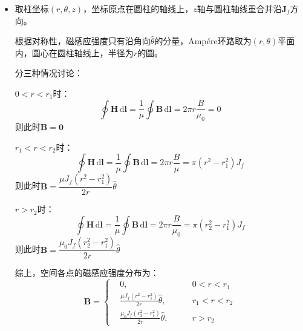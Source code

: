 \documentclass[a4paper,fontset=none]{ctexart}
\begin{document}
\begin{itemize}
        \textparagraph 极化面电荷只分布在界面$r = r_1$及$r = r_2$，设其面密度为$\sigma_p$。

        在界面处有以下方程组：（这里法向量$\bm{n} = \bm{r}$）
        \[
            \bm{n}\cdot(\bm{E}_2 - \bm{E}_1) = E_2 - E_1 = \frac{\sigma_f + \sigma_p}{\varepsilon_0}
        \]
        \[
            \bm{n}\cdot(\bm{D}_2 - \bm{D}_1) = D_2 - D_1 = \sigma_f
        \]
        联立解得：
        \[
            \sigma_p = \left\{
        \begin{aligned}
            & 0,\qquad& r = r_1 \\
            & \frac{\rho_f(r_2^3 - r_1^3)}{3r_2^2}\left(1 - \frac{\varepsilon_0}{\varepsilon}\right),\qquad& r = r_2
        \end{aligned}
        \right.
        \]

        \item[8.(1)]
        取柱坐标$(r,\theta,z)$，坐标原点在圆柱的轴线上，$z$轴与圆柱轴线重合并沿$\bm{J}_f$方向。

        根据对称性，磁感应强度只有沿角向$\hat{\theta}$的分量，Amp\'{e}re环路取为$(r,\theta)$平面内，圆心在圆柱轴线上，半径为$r$的圆。

        分三种情况讨论：

        $0 < r < r_1$时：
        \[
            \oint \bm{H}\,\mathrm{d}\bm{l} = \frac{1}{\mu}\oint \bm{B}\,\mathrm{d}\bm{l} = 2\pi r\frac{B}{\mu_0} = 0
        \]
        则此时$\bm{B} = \bm{0}$

        $r_1 < r < r_2$时：
        \[
            \oint \bm{H}\,\mathrm{d}\bm{l} = \frac{1}{\mu}\oint \bm{B}\,\mathrm{d}\bm{l} = 2\pi r\frac{B}{\mu} = \pi(r^2 - r_1^2)J_f
        \]
        则此时$\bm{B} = \dfrac{\mu J_f(r^2 - r_1^2)}{2r}\hat{\theta}$

        $r > r_2$时：
        \[
            \oint \bm{H}\,\mathrm{d}\bm{l} = \frac{1}{\mu}\oint \bm{B}\,\mathrm{d}\bm{l} = 2\pi r\frac{B}{\mu_0} = \pi(r_2^2 - r_1^2)J_f
        \]
        则此时$\bm{B} = \dfrac{\mu_0 J_f(r_2^2 - r_1^2)}{2r}\hat{\theta}$

        综上，空间各点的磁感应强度分布为：
        \[
            \bm{B} = \left\{
        \begin{aligned}
            & 0,\qquad& 0 < r < r_1 \\
            & \frac{\mu J_f(r^2 - r_1^2)}{2r}\hat{\theta},\qquad& r_1 < r < r_2 \\
            & \frac{\mu_0 J_f(r_2^2 - r_1^2)}{2r}\hat{\theta},\qquad& r > r_2
        \end{aligned}
        \right.
        \]


\end{itemize}
\end{document}
